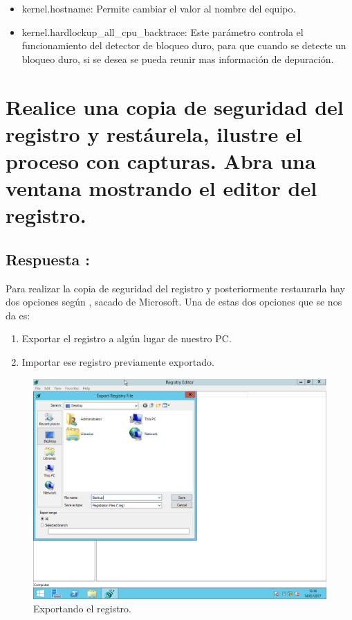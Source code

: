 \begin{itemize}
	\item kernel.hostname: Permite cambiar el valor al nombre del equipo.
	\item kernel.hardlockup\_all\_cpu\_backtrace: Este parámetro controla el funcionamiento del detector de bloqueo duro, para que cuando se detecte un bloqueo duro, si se desea se pueda reunir mas información de depuración.
\end{itemize}
\newpage
\section{Realice una copia de seguridad del registro y restáurela, ilustre el proceso con capturas. Abra una ventana mostrando el editor del registro.}
\subsection{Respuesta : }

Para realizar la copia de seguridad del registro y posteriormente restaurarla hay dos opciones según \cite{RESTOREREGISTRY}, sacado de Microsoft. 
Una de estas dos opciones que se nos da es:

\begin{enumerate}
	\item Exportar el registro a algún lugar de nuestro PC.
	\item Importar ese registro previamente exportado.
\end{enumerate}

\begin{figure}[H]
	\begin{center}
		\includegraphics[width=15cm]{Imagenes/Exportacion_registro}
		\caption{Exportando el registro.}
		\label{fig:6}
	\end{center}
\end{figure}


